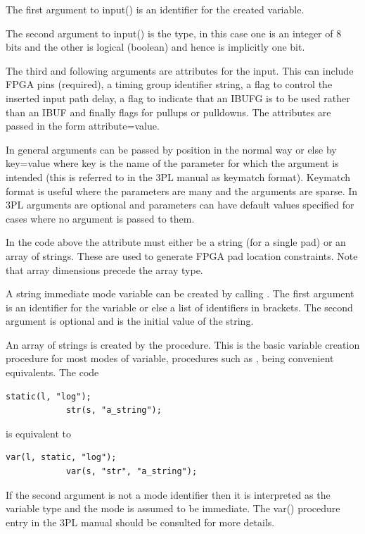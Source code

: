         The first argument to input() is an identifier for the created variable.

        The second argument to input() is the type, in this case one is an integer
        of 8 bits and the other is logical (boolean) and hence is implicitly one bit.

        The third and following arguments are attributes for the input. This can
        include FPGA pins (required), a timing group identifier string, a flag
        to control the inserted input path delay, a flag to indicate that an IBUFG
        is to be used rather than an IBUF and finally flags for pullups or pulldowns.
        The attributes are passed in the form attribute=value.

        In general arguments can be passed by position in the normal way or else by
        key=value where key is the name of the parameter for which the argument is
        intended (this is referred to in the 3PL manual as keymatch format). Keymatch
        format is useful where the parameters are many and the arguments are sparse.
        In 3PL arguments are optional and parameters can have default values specified
        for cases where no argument is passed to them.

        In the code above the  attribute must either be a string (for a
        single pad) or an array of strings. These are used to generate FPGA pad
        location constraints. Note that array dimensions precede the array type.

        A string immediate mode variable can be created by calling .
        The first argument is an identifier for the variable or else a list of
        identifiers in brackets. The second argument is optional and is the initial
        value of the string.

        An array of strings is created by the  procedure. This is the basic
        variable creation procedure for most modes of variable, procedures such
        as , being convenient equivalents. The code
        \begin{lstlisting}[language=threepl]
            static(l, "log");
            str(s, "a_string");
        \end{lstlisting}
        is equivalent to
        \begin{lstlisting}[language=threepl]
            var(l, static, "log");
            var(s, "str", "a_string");
        \end{lstlisting}
        If the second argument is not a mode identifier then it is interpreted as the
        variable type and the mode is assumed to be immediate. The var() procedure entry in
        the 3PL manual should be consulted for more details.   

